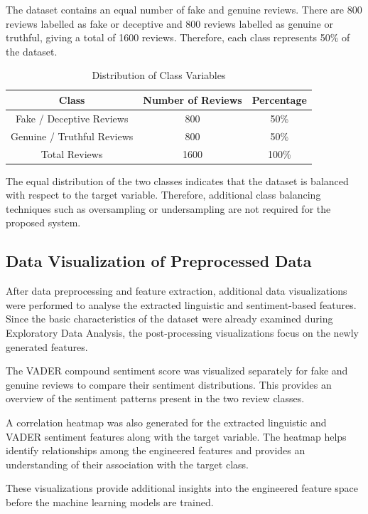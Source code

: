 \documentclass[12pt,a4paper]{report}
\begin{document}
The dataset contains an equal number of fake and genuine reviews. There are 800 reviews labelled as fake or deceptive and 800 reviews labelled as genuine or truthful, giving a total of 1600 reviews. Therefore, each class represents 50\% of the dataset.

\begin{table}[H]
\centering
\renewcommand{\arraystretch}{1.3}
\begin{tabular}{|c|c|c|}
\hline
\textbf{Class} & \textbf{Number of Reviews} & \textbf{Percentage} \\
\hline
Fake / Deceptive Reviews & 800 & 50\% \\
\hline
Genuine / Truthful Reviews & 800 & 50\% \\
\hline
Total Reviews & 1600 & 100\% \\
\hline
\end{tabular}
\caption{Distribution of Class Variables}
\label{tab:classdistribution}
\end{table}

The equal distribution of the two classes indicates that the dataset is balanced with respect to the target variable. Therefore, additional class balancing techniques such as oversampling or undersampling are not required for the proposed system.

\subsection{Data Visualization of Preprocessed Data}

After data preprocessing and feature extraction, additional data visualizations were performed to analyse the extracted linguistic and sentiment-based features. Since the basic characteristics of the dataset were already examined during Exploratory Data Analysis, the post-processing visualizations focus on the newly generated features.

The VADER compound sentiment score was visualized separately for fake and genuine reviews to compare their sentiment distributions. This provides an overview of the sentiment patterns present in the two review classes.

A correlation heatmap was also generated for the extracted linguistic and VADER sentiment features along with the target variable. The heatmap helps identify relationships among the engineered features and provides an understanding of their association with the target class.

These visualizations provide additional insights into the engineered feature space before the machine learning models are trained.
\end{document}
